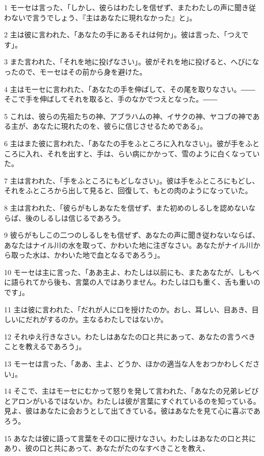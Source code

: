 \par 1 モーセは言った、「しかし、彼らはわたしを信ぜず、またわたしの声に聞き従わないで言うでしょう、『主はあなたに現れなかった』と」。
\par 2 主は彼に言われた、「あなたの手にあるそれは何か」。彼は言った、「つえです」。
\par 3 また言われた、「それを地に投げなさい」。彼がそれを地に投げると、へびになったので、モーセはその前から身を避けた。
\par 4 主はモーセに言われた、「あなたの手を伸ばして、その尾を取りなさい。――そこで手を伸ばしてそれを取ると、手のなかでつえとなった。――
\par 5 これは、彼らの先祖たちの神、アブラハムの神、イサクの神、ヤコブの神である主が、あなたに現れたのを、彼らに信じさせるためである」。
\par 6 主はまた彼に言われた、「あなたの手をふところに入れなさい」。彼が手をふところに入れ、それを出すと、手は、らい病にかかって、雪のように白くなっていた。
\par 7 主は言われた、「手をふところにもどしなさい」。彼は手をふところにもどし、それをふところから出して見ると、回復して、もとの肉のようになっていた。
\par 8 主は言われた、「彼らがもしあなたを信ぜず、また初めのしるしを認めないならば、後のしるしは信じるであろう。
\par 9 彼らがもしこの二つのしるしをも信ぜず、あなたの声に聞き従わないならば、あなたはナイル川の水を取って、かわいた地に注ぎなさい。あなたがナイル川から取った水は、かわいた地で血となるであろう」。
\par 10 モーセは主に言った、「ああ主よ、わたしは以前にも、またあなたが、しもべに語られてから後も、言葉の人ではありません。わたしは口も重く、舌も重いのです」。
\par 11 主は彼に言われた、「だれが人に口を授けたのか。おし、耳しい、目あき、目しいにだれがするのか。主なるわたしではないか。
\par 12 それゆえ行きなさい。わたしはあなたの口と共にあって、あなたの言うべきことを教えるであろう」。
\par 13 モーセは言った、「ああ、主よ、どうか、ほかの適当な人をおつかわしください」。
\par 14 そこで、主はモーセにむかって怒りを発して言われた、「あなたの兄弟レビびとアロンがいるではないか。わたしは彼が言葉にすぐれているのを知っている。見よ、彼はあなたに会おうとして出てきている。彼はあなたを見て心に喜ぶであろう。
\par 15 あなたは彼に語って言葉をその口に授けなさい。わたしはあなたの口と共にあり、彼の口と共にあって、あなたがたのなすべきことを教え、
